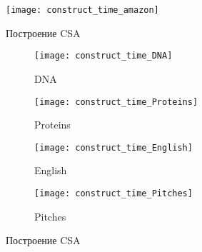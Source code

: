 

\begin{figure}[h!]
	\centering
	\texttt{[image: construct\_time\_amazon]}
	\caption{Построение CSA}
	\label{fig:CSA_construct_time_amazon}
\end{figure}

\begin{figure}[h!]
	\centering
	\begin{subfigure}[b]{0.49\textwidth}
		\centering
		\texttt{[image: construct\_time\_DNA]}
		\caption{DNA}
		\label{fig:y equals x}
	\end{subfigure}
	\hfill
	\begin{subfigure}[b]{0.49\textwidth}
		\centering
		\texttt{[image: construct\_time\_Proteins]}
		\caption{Proteins}
		\label{fig:three sin x}
	\end{subfigure}
	\hfill
	\begin{subfigure}[b]{0.49\textwidth}
		\centering
		\texttt{[image: construct\_time\_English]}
		\caption{English}
		\label{fig:three sin x}
	\end{subfigure}
	\hfill
	\begin{subfigure}[b]{0.49\textwidth}
		\centering
		\texttt{[image: construct\_time\_Pitches]}
		\caption{Pitches}
		\label{fig:three sin x}
	\end{subfigure}
	\caption{Построение CSA}
	\label{fig:three graphs}
\end{figure}

